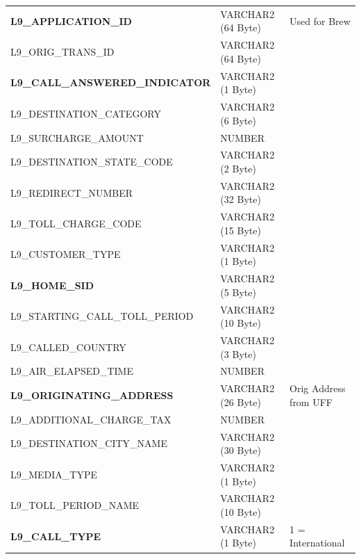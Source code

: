 \documentclass[12pt,twoside]{article}
\begin{document}
\begin{longtable}{lll}
 \textbf{L9\_APPLICATION\_ID}            &  VARCHAR2 (64 Byte)   &  Used for Brew             \\
 L9\_ORIG\_TRANS\_ID                     &  VARCHAR2 (64 Byte)   &                            \\
 \textbf{L9\_CALL\_ANSWERED\_INDICATOR}  &  VARCHAR2 (1 Byte)    &                            \\
 L9\_DESTINATION\_CATEGORY               &  VARCHAR2 (6 Byte)    &                            \\
 L9\_SURCHARGE\_AMOUNT                   &  NUMBER               &                            \\
 L9\_DESTINATION\_STATE\_CODE            &  VARCHAR2 (2 Byte)    &                            \\
 L9\_REDIRECT\_NUMBER                    &  VARCHAR2 (32 Byte)   &                            \\
 L9\_TOLL\_CHARGE\_CODE                  &  VARCHAR2 (15 Byte)   &                            \\
 L9\_CUSTOMER\_TYPE                      &  VARCHAR2 (1 Byte)    &                            \\
 \textbf{L9\_HOME\_SID}                  &  VARCHAR2 (5 Byte)    &                            \\
 L9\_STARTING\_CALL\_TOLL\_PERIOD        &  VARCHAR2 (10 Byte)   &                            \\
 L9\_CALLED\_COUNTRY                     &  VARCHAR2 (3 Byte)    &                            \\
 L9\_AIR\_ELAPSED\_TIME                  &  NUMBER               &                            \\
 \textbf{L9\_ORIGINATING\_ADDRESS}       &  VARCHAR2 (26 Byte)   &  Orig Address from UFF     \\
 L9\_ADDITIONAL\_CHARGE\_TAX             &  NUMBER               &                            \\
 L9\_DESTINATION\_CITY\_NAME             &  VARCHAR2 (30 Byte)   &                            \\
 L9\_MEDIA\_TYPE                         &  VARCHAR2 (1 Byte)    &                            \\
 L9\_TOLL\_PERIOD\_NAME                  &  VARCHAR2 (10 Byte)   &                            \\
 \textbf{L9\_CALL\_TYPE}                 &  VARCHAR2 (1 Byte)    &  1 = International         \\

\end{longtable}
\end{document}
